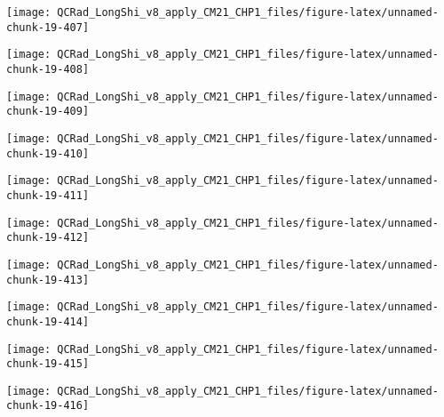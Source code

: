 \documentclass[
  10pt,
  a4paper,oneside]{article}
\begin{document}
\begin{center}\texttt{[image: QCRad\_LongShi\_v8\_apply\_CM21\_CHP1\_files/figure-latex/unnamed-chunk-19-407]} \end{center}

\begin{center}\texttt{[image: QCRad\_LongShi\_v8\_apply\_CM21\_CHP1\_files/figure-latex/unnamed-chunk-19-408]} \end{center}

\begin{center}\texttt{[image: QCRad\_LongShi\_v8\_apply\_CM21\_CHP1\_files/figure-latex/unnamed-chunk-19-409]} \end{center}

\begin{center}\texttt{[image: QCRad\_LongShi\_v8\_apply\_CM21\_CHP1\_files/figure-latex/unnamed-chunk-19-410]} \end{center}

\begin{center}\texttt{[image: QCRad\_LongShi\_v8\_apply\_CM21\_CHP1\_files/figure-latex/unnamed-chunk-19-411]} \end{center}

\begin{center}\texttt{[image: QCRad\_LongShi\_v8\_apply\_CM21\_CHP1\_files/figure-latex/unnamed-chunk-19-412]} \end{center}

\begin{center}\texttt{[image: QCRad\_LongShi\_v8\_apply\_CM21\_CHP1\_files/figure-latex/unnamed-chunk-19-413]} \end{center}

\begin{center}\texttt{[image: QCRad\_LongShi\_v8\_apply\_CM21\_CHP1\_files/figure-latex/unnamed-chunk-19-414]} \end{center}

\begin{center}\texttt{[image: QCRad\_LongShi\_v8\_apply\_CM21\_CHP1\_files/figure-latex/unnamed-chunk-19-415]} \end{center}

\begin{center}\texttt{[image: QCRad\_LongShi\_v8\_apply\_CM21\_CHP1\_files/figure-latex/unnamed-chunk-19-416]} \end{center}
\end{document}
